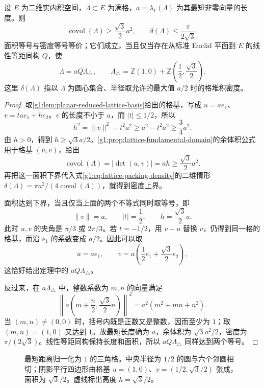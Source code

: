 \begin{theorem}
	\label{g1:thm:planar-lattice-packing-optimum}
	设 \(E\) 为二维实内积空间，\(\Lambda\subset E\) 为满格，\(a=\lambda_1(\Lambda)\) 为其最短非零向量的长度。则
	\[
		\operatorname{covol}(\Lambda)\ge\frac{\sqrt3}{2}a^2,\qquad
		\delta(\Lambda)\le\frac{\pi}{2\sqrt3}.
	\]
	面积等号与密度等号等价；它们成立，当且仅当存在从标准 Euclid 平面到 \(E\) 的线性等距同构 \(Q\)，使
	\[
		\Lambda=aQ\Lambda_{\triangle},\qquad
		\Lambda_{\triangle}
		=\mathbb Z(1,0)+\mathbb Z\left(\frac12,\frac{\sqrt3}{2}\right).
	\]
	这里 \(\delta(\Lambda)\) 指以 \(\Lambda\) 为圆心集合、半径取允许的最大值 \(a/2\) 时的格堆积密度。
\end{theorem}
\begin{proof}
	取\cref{g1:lem:planar-reduced-lattice-basis}给出的格基，写成 \(u=ae_1\)、\(v=tae_1+he_2\)。\(v\) 的长度不小于 \(a\)，而 \(|t|\le1/2\)，所以
	\[
		h^2=\lVert v\rVert^2-t^2a^2
		\ge a^2-t^2a^2
		\ge\frac34a^2.
	\]
	由 \(h>0\)，得到 \(h\ge\sqrt3a/2\)。\cref{g1:prop:lattice-fundamental-domain}的余体积公式用于格基 \((u,v)\)，给出
	\[
		\operatorname{covol}(\Lambda)=|\det(u,v)|=ah
		\ge\frac{\sqrt3}{2}a^2.
	\]
	再把这一面积下界代入式\eqref{g1:eq:lattice-packing-density}的二维情形 \(\delta(\Lambda)=\pi a^2/(4\operatorname{covol}(\Lambda))\)，就得到密度上界。

	面积达到下界，当且仅当上面的两个不等式同时取等号，即
	\[
		\lVert v\rVert=a,\qquad |t|=\frac12,
		\qquad h=\frac{\sqrt3}{2}a.
	\]
	此时 \(u,v\) 的夹角是 \(\pi/3\) 或 \(2\pi/3\)。若 \(t=-1/2\)，用 \(v+u\) 替换 \(v\)，仍得到同一格的格基，而沿 \(e_1\) 的系数变成 \(a/2\)。因此可以取
	\[
		u=ae_1,\qquad v=a\left(\frac12e_1+\frac{\sqrt3}{2}e_2\right),
	\]
	这恰好给出定理中的 \(aQ\Lambda_{\triangle}\)。

	反过来，在 \(a\Lambda_{\triangle}\) 中，整数系数为 \(m,n\) 的向量满足
	\[
		\left\lVert a\left(m+\frac n2,\frac{\sqrt3}{2}n\right)\right\rVert^2
		=a^2(m^2+mn+n^2).
	\]
	当 \((m,n)\ne(0,0)\) 时，括号内既是正数又是整数，因而至少为 \(1\)；取 \((m,n)=(1,0)\) 又达到 \(1\)。故最短长度确为 \(a\)，余体积为 \(\sqrt3a^2/2\)，密度为 \(\pi/(2\sqrt3)\)。线性等距同构保持长度和面积，所以 \(aQ\Lambda_{\triangle}\) 同样达到两个等号。
\end{proof}

\begin{figure}[htbp]
	\centering
	
	\caption[三角格的相切圆与基本胞]{最短距离归一化为 \(1\) 的三角格。中央半径为 \(1/2\) 的圆与六个邻圆相切；阴影平行四边形由格基 \(u=(1,0)\)、\(v=(1/2,\sqrt3/2)\) 张成，面积为 \(\sqrt3/2\)。虚线标出高度 \(h=\sqrt3/2\)。}
	\label{g1:fig:triangular-lattice-packing}
\end{figure}

